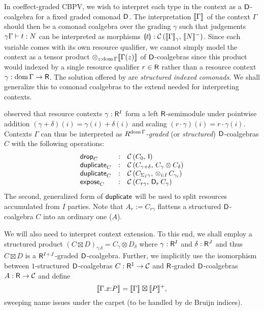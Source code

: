 \documentclass[acmsmall,review,anonymous]{acmart}\settopmatter{printfolios=true,printccs=false,printacmref=false}
\begin{document}
In coeffect-graded CBPV, we wish to interpret each type in the context
as a $\D$-coalgebra for a fixed graded comonad $\D$.  The
interpretation $\den \Gamma$ of the context $\Gamma$ should then be a
comonad coalgebra over the grading $\gamma$ such that judgements
$\qCompTy \gamma \Gamma t N$ can be interpreted as morphisms
$\dent t : \Hom {\Den\Gamma \gamma} {\denn N}$.  Since each variable
comes with its own resource qualifier, we cannot simply model the
context as a tensor product $\tupt {z:\dom\Gamma} \den{\Gamma(z)}$ of
$\D$-coalgebras since this product would indexed by a single resource
qualifier $r \in \R$ rather than a resource context
$\gamma : \dom\Gamma \to \R$.  The solution offered by
\citet{orchard:icfp14} are \emph{structured indexed comonads}.  We
shall generalize this to comonad coalgebras to the extend needed for
interpreting contexts.

\citet{mcBride:wadler60} observed that resource contexts
$\gamma : \R^I$ form a left $\R$-semimodule under pointwise addition
$(\gamma + \delta)(i) = \gamma(i) + \delta(i)$ and scaling
$(r \cdot \gamma)(i) = r \cdot \gamma(i)$.  Contexts $\Gamma$ can thus
be interpreted as \emph{$R^{\dom \Gamma}$-graded}
(or \emph{structured}) $\D$-coalgebras $C$ with
the following operations:
\[
\begin{array}{lcl}
  \tdrop[C]     & : & \Hom {C_0} {\I} \\
  \duplicate[C] & : & \Hom {C_{\gamma+\delta}} {C_\gamma \otimes C_\delta} \\
  \duplicate[C] & : & \Hom {C_{\sumt I \gamma}} {\tupt {i:I} C_{\gamma_i}} \\
  \expose[C]    & : & \Hom {C_{r\gamma}} {\D[r]\,C_\gamma} \\
\end{array}
\]
The second, generalized form of $\tduplicate$ will be used to split
resources accumulated from $I$ parties.  Note that
$A_r := C_{r\gamma}$ flattens a structured $\D$-coalgebra $C$ into an
ordinary one ($A$).

We will also need to interpret context extension.  To this end, we
shall employ a structured product
$(C \boxtimes D)_{\gamma.\delta} = C_\gamma \otimes D_\delta$ where
$\gamma : \R^I$ and $\delta : \R^J$ and thus $C \boxtimes D$ is a
$\R^{I+J}$-graded $\D$-coalgebra.  Further, we implicitly use the
isomorphism between $1$-structured $\D$-coalgebras $C : \R^1 \to \CC$
and $\R$-graded $\D$-coalgebras $A : \R \to \CC$ and define
\[
\den{\ext \Gamma x P}
  = \den \Gamma \boxtimes \denp P
  ,
\]
sweeping name issues under the carpet (to be handled by de Bruijn indices).
\end{document}
